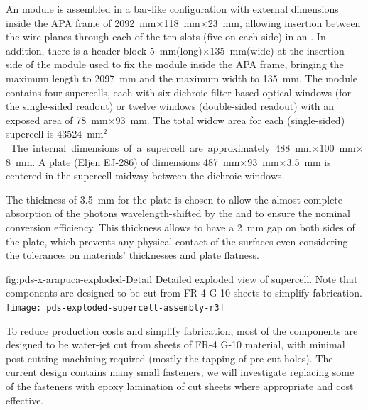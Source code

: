 An  module is assembled in a bar-like configuration with external dimensions inside the APA frame of \SI{2092}{mm}$\times$\SI{118}{mm}$\times$\SI{23}{mm},  allowing insertion between the wire planes through each of the ten slots (five on each side) in an . In addition, there is a header block \SI{5}{mm}(long)$\times$\SI{135}{mm}(wide) at the insertion side of the module used to fix the module inside the APA frame, bringing the maximum length to \SI{2097}{mm} and the maximum width to \SI{135}{mm}.
The module contains four  supercells, each with six dichroic filter-based optical windows (for the single-sided readout) or twelve windows (double-sided readout) with an exposed area of \SI{78}{mm}$\times$\SI{93}{mm}.  
The total widow area for each (single-sided) supercell  is \SI{43524}{mm$^2$}.
The internal dimensions of a supercell are approximately \SI{488}{mm}$\times$\SI{100}{mm}$\times$\SI{8}{mm}. A  plate (Eljen EJ-286) of dimensions \SI{487}{mm}$\times$\SI{93}{mm}$\times$\SI{3.5}{mm} is centered in the supercell midway between the dichroic windows. 

The thickness of \SI{3.5}{mm} for the plate is chosen to allow the almost complete absorption of the photons wavelength-shifted by the  and to ensure the nominal conversion efficiency. This thickness allows to have a \SI{2}{mm}  gap on both sides of the plate, which prevents any physical contact of the surfaces even considering the tolerances on materials' thicknesses and plate flatness.   

\begin{dunefigure}{fig:pds-x-arapuca-exploded-Detail}
{Detailed exploded view of  supercell. Note that components are designed to be cut from FR-4 G-10 sheets to simplify fabrication.}
   \texttt{[image: pds-exploded-supercell-assembly-r3]}
\end{dunefigure}

To reduce production costs and simplify fabrication, most of the  components are designed to be water-jet cut from sheets of FR-4 G-10 material, with minimal post-cutting machining required (mostly the tapping of pre-cut holes).  The current design contains many small fasteners; we will investigate replacing some of the fasteners with epoxy lamination of cut sheets where appropriate and cost effective.

